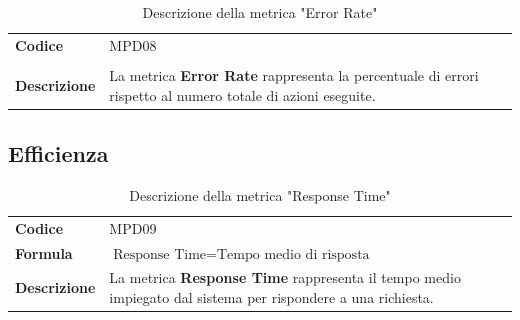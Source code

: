 \documentclass[a4paper,12pt]{article}
\begin{document}
        {\renewcommand{\arraystretch}{1.4}
            \begin{table}[H]
            \centering
            \begin{tabularx}{\textwidth}{|l|X|}
                \hline
                \rowcolor{gold}
                \multicolumn{2}{|c|}{\textbf{Error Rate}}\\
                \hline
                \textbf{Codice} & MPD08 \\
                \hline
                \raisebox{0.6\height}{\textbf{Formula}} &  \rule{0pt}{5ex}\raisebox{0.3\height}{\( \displaystyle \text{Error Rate} = \frac{\text{Numero di errori totali}}{\text{Numero di azioni totali}}*100 \)}\\
                \hline
                \textbf{Descrizione} & La metrica \textbf{Error Rate} rappresenta la percentuale di errori rispetto al numero totale di azioni eseguite. \\
                \hline
            \end{tabularx}      
            \caption{Descrizione della metrica "Error Rate"}
            \end{table}
        }

        \subsection{Efficienza}

        {\renewcommand{\arraystretch}{1.4}
            \begin{table}[H]
            \centering
            \begin{tabularx}{\textwidth}{|l|X|}
                \hline
                \rowcolor{gold}
                \multicolumn{2}{|c|}{\textbf{Response Time}}\\
                \hline
                \textbf{Codice} & MPD09 \\
                \hline
                \textbf{Formula} & \( \displaystyle \text{Response Time} = {\text{Tempo medio di risposta}} \)\\
                \hline
                \textbf{Descrizione} & La metrica \textbf{Response Time} rappresenta il tempo medio impiegato dal sistema per rispondere a una richiesta. \\
                \hline
            \end{tabularx}      
            \caption{Descrizione della metrica "Response Time"}
            \end{table}
        }
\end{document}
